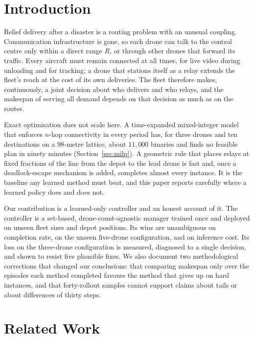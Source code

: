 \documentclass[12pt]{article}
\begin{document}
\section{Introduction}

Relief delivery after a disaster is a routing problem with an unusual coupling. Communication
infrastructure is gone, so each drone can talk to the control centre only within a direct range
$R$, or through other drones that forward its traffic. Every aircraft must remain connected at
all times, for live video during unloading and for tracking; a drone that stations itself as a
relay extends the fleet's reach at the cost of its own deliveries. The fleet therefore makes,
continuously, a joint decision about who delivers and who relays, and the makespan of serving
all demand depends on that decision as much as on the routes.

Exact optimisation does not scale here. A time-expanded mixed-integer model that enforces
$n$-hop connectivity in every period has, for three drones and ten destinations on a 98-metre
lattice, about $11{,}000$ binaries and finds no feasible plan in ninety minutes
(Section~\ref{sec:milp}). A geometric rule that places relays at fixed fractions of the line
from the depot to the lead drone is fast and, once a deadlock-escape mechanism is added,
completes almost every instance. It is the baseline any learned method must beat, and this paper
reports carefully where a learned policy does and does not.

Our contribution is a learned-only controller and an honest account of it. The controller is
a set-based, drone-count-agnostic manager trained once and deployed on unseen fleet sizes and
depot positions. Its wins are unambiguous on completion rate, on the unseen five-drone
configuration, and on inference cost. Its loss on the three-drone configuration is measured,
diagnosed to a single decision, and shown to resist five plausible fixes. We also document two
methodological corrections that changed our conclusions: that comparing makespan only over the
episodes each method completed favours the method that gives up on hard instances, and that
forty-rollout samples cannot support claims about tails or about differences of thirty steps.

\section{Related Work}
\end{document}

